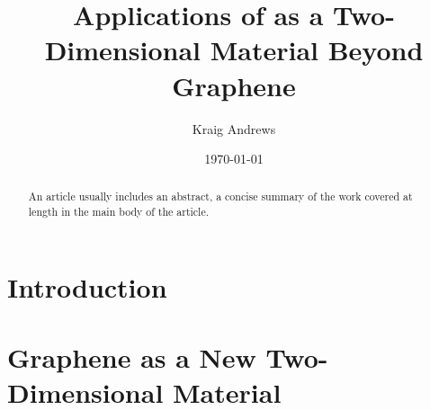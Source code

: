 \documentclass[%
 reprint,
 amsmath,amssymb,
 aps,
pra,
floatfix,
]{revtex4-1}
\begin{document}

\title{Applications of  as a Two-Dimensional Material Beyond Graphene}%

\author{Kraig Andrews}%
%




\date{\today}%

\begin{abstract}
An article usually includes an abstract, a concise summary of the work
covered at length in the main body of the article. 
\end{abstract}

\maketitle

\tableofcontents

\section{\label{sec:introduction} Introduction}

\section{\label{sec:graphene_properties} Graphene as a New Two-Dimensional Material}
\end{document}
